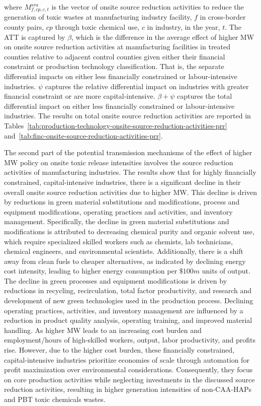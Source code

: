\documentclass[12pt, english]{article}
\begin{document}
    where $M_{f,cp,c,t}^{sra}$ is the vector of onsite source reduction activities to reduce the generation of toxic wastes at manufacturing industry facility, $f$ in cross-border county pairs, $cp$ through toxic chemical use, $c$ in industry, in the year, $t$. The ATT is captured by $\beta$, which is the difference in the average effect of higher MW on onsite source reduction activities at manufacturing facilities in treated counties relative to adjacent control counties given either their financial constraint or production technology classification. That is, the separate differential impacts on either less financially constrained or labour-intensive industries. $\psi$ captures the relative differential impact on industries with greater financial constraint or are more capital-intensive. $\beta + \psi$ captures the total differential impact on either less financially constrained or labour-intensive industries.
    The results on total onsite source reduction activities are reported in Tables~\ref{tab:production-technology-onsite-source-reduction-activities-prr} and~\ref{tab:finc-onsite-source-reduction-activities-prr}.

    The second part of the potential transmission mechanisms of the effect of higher MW policy on onsite toxic release intensities involves the source reduction activities of manufacturing industries. The results show that for highly financially constrained, capital-intensive industries, there is a significant decline in their overall onsite source reduction activities due to higher MW. This decline is driven by reductions in green material substitutions and modifications, process and equipment modifications, operating practices and activities, and inventory management. Specifically, the decline in green material substitutions and modifications is attributed to decreasing chemical purity and organic solvent use, which require specialized skilled workers such as chemists, lab technicians, chemical engineers, and environmental scientists. Additionally, there is a shift away from clean fuels to cheaper alternatives, as indicated by declining energy cost intensity, leading to higher energy consumption per $\$100m$ units of output. The decline in green processes and equipment modifications is driven by reductions in recycling, recirculation, total factor productivity, and research and development of new green technologies used in the production process. Declining operating practices, activities, and inventory management are influenced by a reduction in product quality analysis, operating training, and improved material handling. As higher MW leads to an increasing cost burden and employment/hours of high-skilled workers, output, labor productivity, and profits rise. However, due to the higher cost burden, these financially constrained, capital-intensive industries prioritize economies of scale through automation for profit maximization over environmental considerations. Consequently, they focus on core production activities while neglecting investments in the discussed source reduction activities, resulting in higher generation intensities of non-CAA-HAPs and PBT toxic chemicals wastes.
\end{document}
